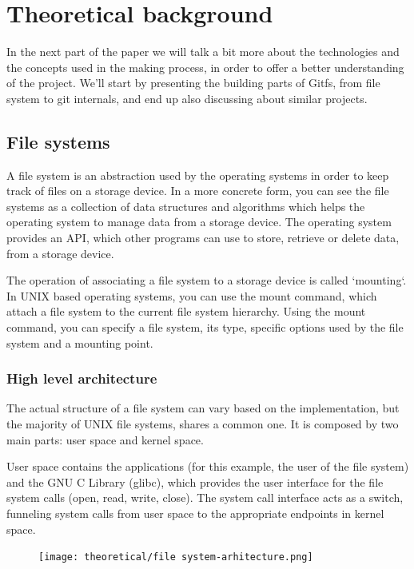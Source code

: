 \chapter{Theoretical background}

\label{ch:theoretical}
In the next part of the paper we will talk a bit more about the technologies and the concepts used in the making process, in order to offer a better understanding of the project. We'll start by presenting the building parts of Gitfs, from file system to git internals, and end up also discussing about similar projects. 

\section{File systems}
    A file system is an abstraction used by the operating systems in order to keep track of files on a storage device. In a more concrete form, you can see the file systems as a collection of data structures and algorithms which helps the operating system to manage data from a storage device. The operating system provides an API, which other programs can use to store, retrieve or delete data, from a storage device.
    
    The operation of associating a file system to a storage device is called `mounting`. In UNIX based operating systems, you can use the mount command, which attach a file system to the current file system hierarchy. Using the mount command, you can specify a file system, its type, specific options used by the file system and a mounting point.

    \subsection{High level architecture}
        The actual structure of a file system can vary based on the implementation, but the majority of UNIX file systems, shares a common one. It is composed by two main parts: user space and kernel space. 
        
        User space contains the applications (for this example, the user of the file system) and the GNU C Library (glibc), which provides the user interface for the file system calls (open, read, write, close). The system call interface acts as a switch, funneling system calls from user space to the appropriate endpoints in kernel space. 
        
        \begin{figure}[h]
           \begin{center}
               \texttt{[image: theoretical/file system-arhitecture.png]}
            \end{center}
        \end{figure}

